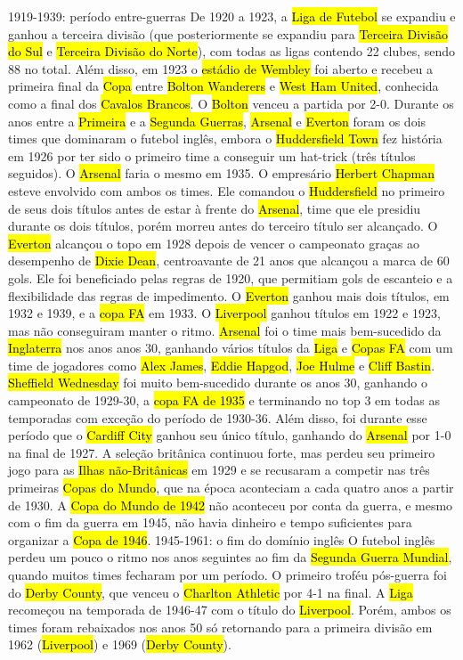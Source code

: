 \documentclass[a4paper,12pt]{article}
\begin{document}
1919-1939: período entre-guerras
De 1920 a 1923, a \hl{Liga de Futebol} se expandiu e ganhou a terceira divisão (que posteriormente se expandiu para \hl{Terceira Divisão do Sul} e \hl{Terceira Divisão do Norte}), com todas as ligas contendo 22 clubes, sendo 88 no total. Além disso, em 1923 o \hl{estádio de Wembley} foi aberto e recebeu a primeira final da \hl{Copa} entre \hl{Bolton Wanderers} e \hl{West Ham United}, conhecida como a final dos \hl{Cavalos Brancos}. O \hl{Bolton} venceu a partida por 2-0.
Durante os anos entre a \hl{Primeira} e a \hl{Segunda Guerras}, \hl{Arsenal} e \hl{Everton} foram os dois times que dominaram o futebol inglês, embora o \hl{Huddersfield Town} fez história em 1926 por ter sido o primeiro time a conseguir um hat-trick (três títulos seguidos). O \hl{Arsenal} faria o mesmo em 1935. O empresário \hl{Herbert Chapman} esteve envolvido com ambos os times. Ele comandou o \hl{Huddersfield} no primeiro de seus dois títulos antes de estar à frente do \hl{Arsenal}, time que ele presidiu durante os dois títulos, porém morreu antes do terceiro título ser alcançado.
O \hl{Everton} alcançou o topo em 1928 depois de vencer o campeonato graças ao desempenho de \hl{Dixie Dean}, centroavante de 21 anos que alcançou a marca de 60 gols. Ele foi beneficiado pelas regras de 1920, que permitiam gols de escanteio e a flexibilidade das regras de impedimento. O \hl{Everton} ganhou mais dois títulos, em 1932 e 1939, e a \hl{copa FA} em 1933. O \hl{Liverpool} ganhou títulos em 1922 e 1923, mas não conseguiram manter o ritmo. \hl{Arsenal} foi o time mais bem-sucedido da \hl{Inglaterra} nos anos anos 30, ganhando vários títulos da \hl{Liga} e \hl{Copas FA} com um time de jogadores como \hl{Alex James}, \hl{Eddie Hapgod}, \hl{Joe Hulme} e \hl{Cliff Bastin}.
\hl{Sheffield Wednesday} foi muito bem-sucedido durante os anos 30, ganhando o campeonato de 1929-30, a \hl{copa FA de 1935} e terminando no top 3 em todas as temporadas com exceção do período de 1930-36. Além disso, foi durante esse período que o \hl{Cardiff City} ganhou seu único título, ganhando do \hl{Arsenal} por 1-0 na final de 1927.
A seleção britânica continuou forte, mas perdeu seu primeiro jogo para as \hl{Ilhas não-Britânicas} em 1929 e se recusaram a competir nas três primeiras \hl{Copas do Mundo}, que na época aconteciam a cada quatro anos a partir de 1930. A \hl{Copa do Mundo de 1942} não aconteceu por conta da guerra, e mesmo com o fim da guerra em 1945, não havia dinheiro e tempo suficientes para organizar a \hl{Copa de 1946}.
1945-1961: o fim do domínio inglês
O futebol inglês perdeu um pouco o ritmo nos anos seguintes ao fim da \hl{Segunda Guerra Mundial}, quando muitos times fecharam por um período. O primeiro troféu pós-guerra foi do \hl{Derby County}, que venceu o \hl{Charlton Athletic} por 4-1 na final. A \hl{Liga} recomeçou na temporada de 1946-47 com o título do \hl{Liverpool}. Porém, ambos os times foram rebaixados nos anos 50 só retornando para a primeira divisão em 1962 (\hl{Liverpool}) e 1969 (\hl{Derby County}).
\end{document}
